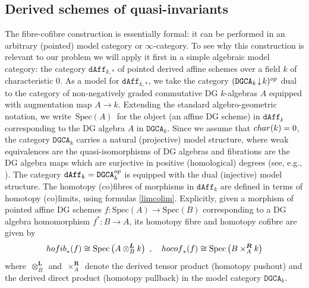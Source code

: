 \documentclass[11pt]{amsart}
\theoremstyle{definition}
\theoremstyle{remark}
\numberwithin{equation}{section}
\newcommand{\la}{\label}
\newcommand{\Spec}{\mathrm{Spec}}
\def\bs#1{\boldsymbol{#1}}
\def\L{\boldsymbol{L}}
\def\dgca{\mathtt{DGCA}}
\def\dAff{\mathtt{dAff}}
\begin{document}
\subsection{Derived schemes of quasi-invariants}
\la{S4.2}
The fibre-cofibre construction is essentially formal: it can be performed in an arbitrary (pointed) model category or $\infty$-category. To see why this construction is relevant
to our problem we will apply it first in a simple algebraic model category: the category $\dAff_{k, \ast}$ of pointed derived affine schemes over a field $k$ of characteristic $0$. As a model for $\dAff_{k, \ast}$, we take the category $(\dgca_{k}\! \downarrow \! k)^{\rm op} $ dual to the category of non-negatively graded commutative DG $k$-algebras $A$  equipped with augmentation map $A \to k $. Extending the standard algebro-geometric notation, we write $\, \Spec(A) \,$ for the object (an affine DG scheme) in $ \dAff_{k}  $ corresponding to the DG algebra $ A $ in $ \dgca_k $.
Since we assume that $ {\rm char}(k) = 0 $, the category $ \dgca_{k} $ carries a natural 
(projective) model structure, where  weak equivalences are the quasi-isomorphisms of DG algebras and
fibrations are the DG algebra maps which are surjective in positive (homological) degrees (see, e.g., \cite[Appendix B]{BKR13}). The category $ \dAff_{k} = \dgca_{k}^{\rm op} $ is equipped with the dual (injective) model structure. The homotopy (co)fibres  of morphisms in $ \dAff_{k} $ are defined in terms of homotopy (co)limits, using formulas \eqref{limcolim}.
Explicitly, given a morphism of pointed affine DG schemes $ f: \Spec(A) \to \Spec(B) $ corresponding to a DG algebra 
homomorphism $ f^*: B \to A $, its homotopy fibre and homotopy cofibre are given by
%
\begin{equation}
\la{hocof}
{\rm hofib}_*(f) \cong \Spec\left(A \otimes^{\L}_{B} k\right)\ ,\quad
{\rm hocof}_*(f) \cong \Spec\left(B \times^{\bs{R}}_{A} k\right)
\end{equation}
%
where $\, \otimes^{\L}_B \,$ and $\,\times^{\bs{R}}_{A}\,$ denote the derived tensor product
(homotopy pushout) and the derived direct product (homotopy pullback) in the model category $\dgca_k $.

\vspace{1ex}
\end{document}
